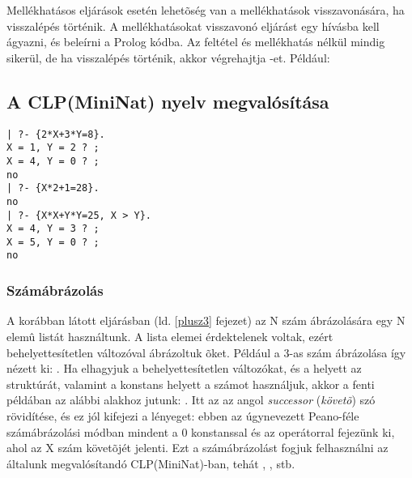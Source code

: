
Mellékhatásos eljárások esetén lehetõség van a mellékhatások visszavonására,
ha visszalépés történik. A mellékhatásokat visszavonó eljárást egy 
hívásba kell ágyazni, és beleírni a Prolog kódba. Az  feltétel
és mellékhatás nélkül mindig sikerül, de ha visszalépés történik, akkor
végrehajtja -et. Például:


\subsection{A CLP(MiniNat) nyelv megvalósítása}

\begin{verbatim}
| ?- {2*X+3*Y=8}.
X = 1, Y = 2 ? ; 
X = 4, Y = 0 ? ;
no
| ?- {X*2+1=28}.
no
| ?- {X*X+Y*Y=25, X > Y}.
X = 4, Y = 3 ? ; 
X = 5, Y = 0 ? ;
no
\end{verbatim}

\subsubsection{Számábrázolás}

A korábban látott  eljárásban (ld. \ref{plusz3} fejezet) az
N szám ábrázolására egy N elemû listát használtunk. A lista elemei érdektelenek
voltak, ezért behelyettesítetlen változóval ábrázoltuk õket. Például a 
3-as szám ábrázolása így nézett ki: .
Ha elhagyjuk a behelyettesítetlen változókat, és a  helyett az
 struktúrát, valamint a \cd{[]} konstans helyett a  számot
használjuk, akkor a fenti példában az alábbi alakhoz jutunk: .
Itt az  az angol \emph{successor} (\emph{követõ}) szó rövidítése,
és ez jól kifejezi a lényeget: ebben az úgynevezett Peano-féle számábrázolási
módban mindent a 0 konstanssal és az  operátorral fejezünk ki, ahol
 az X szám követõjét jelenti. Ezt a számábrázolást fogjuk felhasználni
az általunk megvalósítandó CLP(MiniNat)-ban, tehát , ,
 stb.

